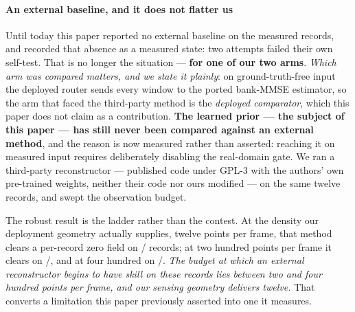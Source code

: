 \documentclass[review]{elsarticle}
\begin{document}
\paragraph{An external baseline, and it does not flatter us}
Until today this paper reported no external baseline on the measured records, and
recorded that absence as a measured state: two attempts failed their own self-test.
That is no longer the situation --- \textbf{for one of our two arms}. \emph{Which arm was
compared matters, and we state it plainly}: on ground-truth-free input the deployed
router sends every window to the ported bank-MMSE estimator, so the arm that faced the
third-party method is the \emph{deployed comparator}, which this paper does not claim as
a contribution. \textbf{The learned prior --- the subject of this paper --- has still
never been compared against an external method}, and the reason is now measured rather
than asserted: reaching it on measured input requires deliberately disabling the
real-domain gate. We ran a third-party reconstructor --- published code
under GPL-3 with the authors' own pre-trained weights, neither their code nor ours
modified --- on the same twelve records, and swept the observation budget.

The robust result is the ladder rather than the contest. At the density our deployment
geometry actually supplies, twelve points per frame, that method clears a per-record
zero field on \EOneSelfTwelve{}/\EOneN{} records; at two hundred points per frame it
clears on \EOneSelfTwoHundred{}/\EOneN{}, and at four hundred on
\EOneSelfFourHundred{}/\EOneN{}. \emph{The budget at which an external reconstructor
begins to have skill on these records lies between two and four hundred points per
frame, and our sensing geometry delivers twelve.} That converts a limitation this paper
previously asserted into one it measures.
\end{document}
